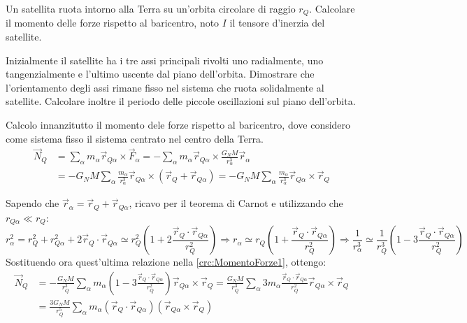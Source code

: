 \documentclass[../main.tex]{subfiles}
\begin{document}
\label{ex:crc}

\textex
Un satellita ruota intorno alla Terra su un'orbita circolare di raggio $r_Q$. Calcolare il momento delle forze rispetto al baricentro, noto $I$ il tensore d'inerzia del satellite. 

Inizialmente il satellite ha i tre assi principali rivolti uno radialmente, uno tangenzialmente e l'ultimo uscente dal piano dell'orbita. Dimostrare che l'orientamento degli assi rimane fisso nel sistema che ruota solidalmente al satellite. Calcolare inoltre il periodo delle piccole oscillazioni sul piano dell'orbita.

\solution
Calcolo innanzitutto il momento dele forze rispetto al baricentro, dove considero come sistema fisso il sistema centrato nel centro della Terra.
\begin{equation}\label{crc:MomentoForze1}
\begin{split}
	\vec N_Q	& =\sum_\alpha m_\alpha \vec r_{Q\alpha} \times \vec F_\alpha=-\sum_\alpha m_\alpha \vec r_{Q\alpha} \times \frac {G_N M}{r_\alpha^3}\vec r_\alpha \\
				&= -G_NM\sum_\alpha \frac {m_\alpha}{r_\alpha^3} \vec r_{Q\alpha} \times (\vec r_Q+\vec r_{Q\alpha})=-G_NM\sum_\alpha \frac {m_\alpha}{r_\alpha^3} \vec r_{Q\alpha} \times \vec r_Q
\end{split}
\end{equation}

Sapendo che $\vec r_\alpha=\vec r_Q+\vec r_{Q\alpha}$, ricavo per il teorema di Carnot e utilizzando che $r_{Q\alpha}\ll r_Q$:
\begin{equation*}
	r_\alpha^2=r_Q^2+r_{Q\alpha}^2+2\vec r_Q\cdot \vec r_{Q\alpha}\simeq r_Q^2 \left( 1+2\frac{\vec r_Q\cdot \vec r_{Q\alpha}}{r_Q^2} \right)
	\Longrightarrow  r_\alpha \simeq r_Q \left( 1+\frac{\vec r_Q\cdot \vec r_{Q\alpha}}{r_Q^2} \right) \Longrightarrow  \frac{1}{r_\alpha^3} \simeq \frac{1}{r_Q^3} \left( 1-3\frac{\vec r_Q\cdot \vec r_{Q\alpha}}{r_Q^2} \right)
\end{equation*}
Sostituendo ora quest'ultima relazione nella \cref{crc:MomentoForze1}, ottengo:
\begin{equation}
\begin{split}
	\vec N_Q & = -\frac{G_NM}{r_Q^3}\sum_\alpha m_\alpha   \left( 1-3\frac{\vec r_Q\cdot \vec r_{Q\alpha}}{r_Q^2} \right) \vec r_{Q\alpha} \times \vec r_Q = \frac{G_NM}{r_Q^3}\sum_\alpha 3 m_\alpha   \frac{\vec r_Q\cdot \vec r_{Q\alpha}}{r_Q^2} \vec r_{Q\alpha}\times \vec r_Q\\
		&= \frac{3G_NM}{r_Q^5}\sum_\alpha m_\alpha   (\vec r_Q\cdot \vec r_{Q\alpha})( \vec r_{Q\alpha}\times \vec r_Q)
\end{split}
\end{equation}
\end{document}
